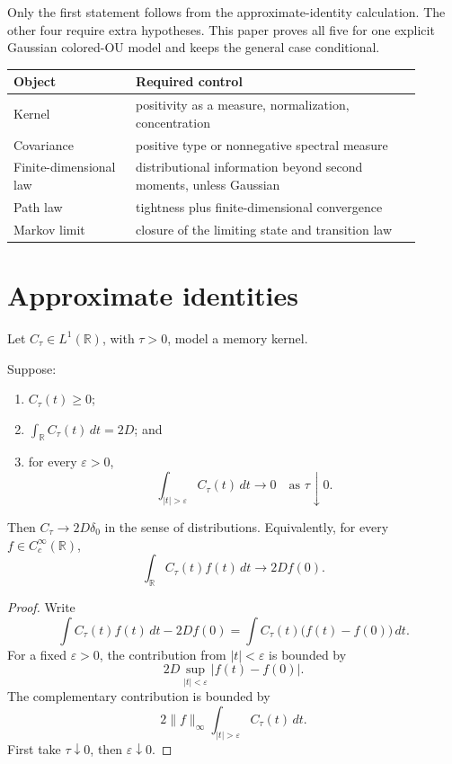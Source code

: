 \documentclass[11pt]{article}
\begin{document}
Only the first statement follows from the approximate-identity calculation.
The other four require extra hypotheses. This paper proves all five for one
explicit Gaussian colored-OU model and keeps the general case conditional.

\begin{center}
\begin{tabular}{p{0.27\linewidth}p{0.63\linewidth}}
\toprule
Object & Required control\\
\midrule
Kernel & positivity as a measure, normalization, concentration\\
Covariance & positive type or nonnegative spectral measure\\
Finite-dimensional law & distributional information beyond second moments,
unless Gaussian\\
Path law & tightness plus finite-dimensional convergence\\
Markov limit & closure of the limiting state and transition law\\
\bottomrule
\end{tabular}
\end{center}

\section{Approximate identities}

Let \(C_\tau\in L^1(\mathbb{R})\), with \(\tau>0\), model a memory kernel.

\begin{theorem}
\label{thm:delta}
Suppose:
\begin{enumerate}
\item \(C_\tau(t)\geq0\);
\item \(\int_{\mathbb R}C_\tau(t)\,dt=2D\); and
\item for every \(\varepsilon>0\),
\[
\int_{|t|>\varepsilon}C_\tau(t)\,dt\longrightarrow0
\quad\text{as }\tau\downarrow0.
\]
\end{enumerate}
Then \(C_\tau\to2D\delta_0\) in the sense of distributions. Equivalently,
for every \(f\in C_c^\infty(\mathbb{R})\),
\[
\int_{\mathbb R}C_\tau(t)f(t)\,dt\longrightarrow2Df(0).
\]
\end{theorem}

\begin{proof}
Write
\[
\int C_\tau(t)f(t)\,dt-2Df(0)
=\int C_\tau(t)\bigl(f(t)-f(0)\bigr)\,dt.
\]
For a fixed \(\varepsilon>0\), the contribution from
\(|t|<\varepsilon\) is bounded by
\[
2D\sup_{|t|<\varepsilon}|f(t)-f(0)|.
\]
The complementary contribution is bounded by
\[
2\|f\|_\infty
\int_{|t|>\varepsilon}C_\tau(t)\,dt.
\]
First take \(\tau\downarrow0\), then
\(\varepsilon\downarrow0\).
\end{proof}
\end{document}
